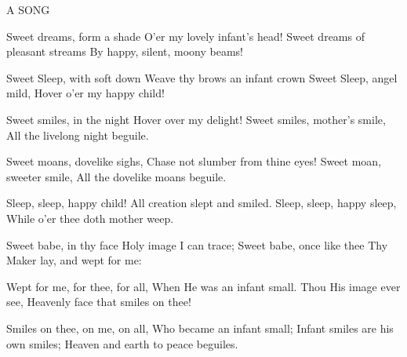 A SONG

   Sweet dreams, form a shade
   O'er my lovely infant's head!
   Sweet dreams of pleasant streams
   By happy, silent, moony beams!
   
   Sweet Sleep, with soft down
   Weave thy brows an infant crown
   Sweet Sleep, angel mild,
   Hover o'er my happy child!
   
   Sweet smiles, in the night
   Hover over my delight!
   Sweet smiles, mother's smile,
   All the livelong night beguile.
   
   Sweet moans, dovelike sighs,
   Chase not slumber from thine eyes!
   Sweet moan, sweeter smile,
   All the dovelike moans beguile.
   
   Sleep, sleep, happy child!
   All creation slept and smiled.
   Sleep, sleep, happy sleep,
   While o'er thee doth mother weep.
   
   Sweet babe, in thy face
   Holy image I can trace;
   Sweet babe, once like thee
   Thy Maker lay, and wept for me:
   
   Wept for me, for thee, for all,
   When He was an infant small.
   Thou His image ever see,
   Heavenly face that smiles on thee!
   
   Smiles on thee, on me, on all,
   Who became an infant small;
   Infant smiles are his own smiles;
   Heaven and earth to peace beguiles.